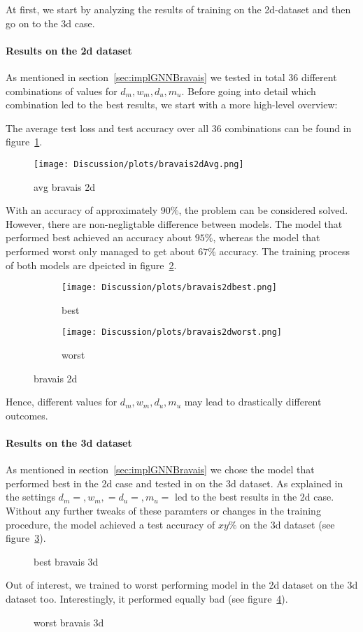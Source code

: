 At first, we start by analyzing the results of training on the 2d-dataset and then go on to the 3d case.

\paragraph{Results on the 2d dataset}
As mentioned in section~\ref{sec:implGNNBravais} we tested in total 36 different combinations of values for $d_m,w_m,d_u,m_u$.
Before going into detail which combination led to the best results, we start 
with a more high-level overview:

The average test loss and test accuracy over all 36 combinations can be found in figure~\ref{fig:avgBravais2d}.
\begin{figure}[h]
    \centering
    \texttt{[image: Discussion/plots/bravais2dAvg.png]}
    \caption{avg bravais 2d}
    \label{fig:avgBravais2d}
\end{figure}
With an accuracy of approximately $90\%$, the problem can be considered solved. 
However, there are non-negligtable difference between models. 
The model that performed best achieved an accuracy about $95\%$, whereas the model that performed worst
only managed to get about $67\%$ accuracy. The training process of both models are dpeicted in figure~\ref{fig:bravais2dBestWorst}.
\begin{figure}[h]
    \centering
    \begin{subfigure}[t]{0.45\textwidth}
        \centering
        \texttt{[image: Discussion/plots/bravais2dbest.png]}
        \caption{best}
    \end{subfigure}
    \hfill
    \begin{subfigure}[t]{0.45\textwidth}
        \centering
        \texttt{[image: Discussion/plots/bravais2dworst.png]}
        \caption{worst}
    \end{subfigure}
    \caption{bravais 2d}
    \label{fig:bravais2dBestWorst}    
\end{figure}
Hence, different values for $d_m,w_m,d_u,m_u$ may lead to drastically different outcomes. 

\paragraph{Results on the 3d dataset}
As mentioned in section~\ref{sec:implGNNBravais} we chose the model that 
performed best in the 2d case and tested in on the 3d dataset. 
As explained in the settings $d_m=,w_m,=d_u=,m_u=$ led to the best results 
in the 2d case. Without any further tweaks of these paramters or changes in the training procedure,
the model achieved a test accuracy of $xy\%$ on the 3d dataset (see figure~\ref{fig:bravaisBest3d}).
\begin{figure}[h]
    \centering
    \caption{best bravais 3d}
    \label{fig:bravaisBest3d}
\end{figure}
Out of interest, we trained to worst performing model in the 2d dataset on the 3d dataset too.
Interestingly, it performed equally bad (see figure~\ref{fig:bravaisWorst3d}).
\begin{figure}[h]
    \centering
    \caption{worst bravais 3d}
    \label{fig:bravaisWorst3d}
\end{figure}